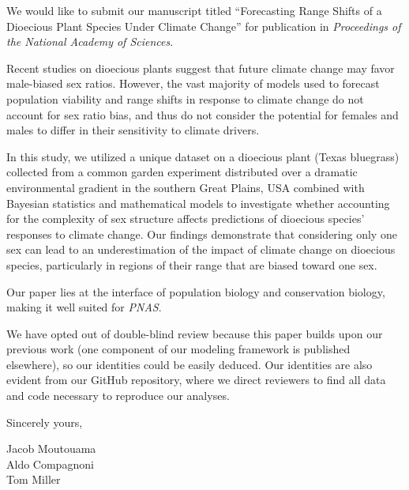 \documentclass{article}
\begin{document}
We would like to submit our manuscript titled “Forecasting Range Shifts of a Dioecious Plant Species Under Climate Change” for publication in  \textit{
Proceedings of the National Academy of Sciences}.

Recent studies on dioecious plants suggest that future climate change may favor male-biased sex ratios. However, the vast majority of models used to forecast population viability and range shifts in response to climate change do not account for sex ratio bias, and thus do not consider the potential for females and males to differ in their sensitivity to climate drivers.

In this study, we utilized a unique dataset on a dioecious plant (Texas bluegrass) collected from a common garden experiment distributed over a dramatic environmental gradient in the southern Great Plains, USA combined with Bayesian statistics and mathematical models to investigate whether accounting for the complexity of sex structure affects predictions of dioecious species’ responses to climate change. Our findings demonstrate that considering only one sex can lead to an underestimation of the impact of climate change on dioecious species, particularly in regions of their range that are biased toward one sex.

Our paper lies at the interface of population biology and conservation biology, making it well suited for \textit{PNAS}.

We have opted out of double-blind review because this paper builds upon our previous work (one component of our modeling framework is published elsewhere), so our identities could be easily deduced. Our identities are also evident from our GitHub repository, where we direct reviewers to find all data and code necessary to reproduce our analyses.

\bigskip %

Sincerely yours,

\vspace{20pt} %


Jacob Moutouama \\
Aldo Compagnoni \\
Tom Miller
\end{document}
